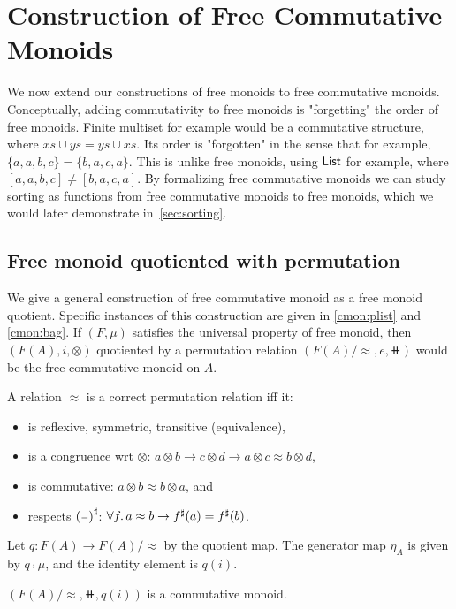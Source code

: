 \section{Construction of Free Commutative Monoids}
\label{sec:commutative-monoids}

We now extend our constructions of free monoids to free commutative monoids.
Conceptually, adding commutativity to free monoids is "forgetting" the order
of free monoids. Finite multiset for example would be a commutative structure,
where $xs \cup ys = ys \cup xs$. Its order is "forgotten" in the sense that for example,
$\{a, a, b, c\} = \{b, a, c, a\}$. This is unlike free monoids, using $\operatorname{\mathsf{List}}$ for example, 
where $[a, a, b, c] \neq [b, a, c, a]$. By formalizing free commutative monoids
we can study sorting as functions from free commutative monoids to free monoids,
which we would later demonstrate in~\ref{sec:sorting}.

\subsection{Free monoid quotiented with permutation}\label{cmon:qfreemon}
We give a general construction of free commutative monoid as a free monoid quotient.
Specific instances of this construction are given in \ref{cmon:plist} and \ref{cmon:bag}.
If $(F, \mu)$ satisfies the universal property of free monoid,
then $(F(A), i, \otimes)$ quotiented by a permutation relation $(F(A) / \approx, e, \doubleplus)$
would be the free commutative monoid on $A$.

A relation $\approx$ is a correct permutation relation iff it:
\begin{itemize}
    \item is reflexive, symmetric, transitive (equivalence),
    \item is a congruence wrt $\otimes$: $a \otimes b \to c \otimes d \to a \otimes c \approx b \otimes d$,
    \item is commutative: $a \otimes b \approx b \otimes a$, and
    \item respects ${({\scriptstyle{-}})}^{\sharp}$: $\forall f. \, a \approx b \to {f}^{\sharp}(a) = {f}^{\sharp}(b)$.
\end{itemize}

Let $q : F(A) \to F(A) / \approx$ by the quotient map.
The generator map $\eta_A$ is given by $q \comp \mu$, and the identity element is $q(i)$.

\begin{proposition}
$(F(A) / \approx, \doubleplus, q(i))$ is a commutative monoid.
\end{proposition}

